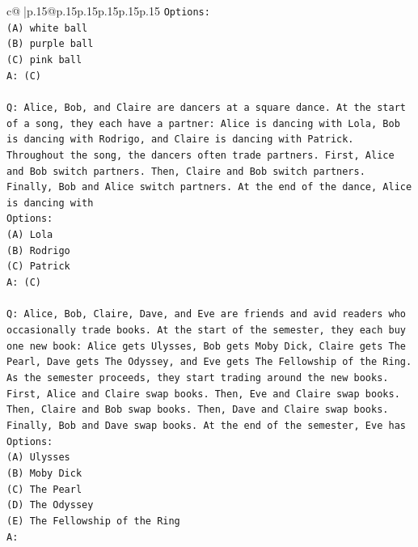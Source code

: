\documentclass{article}
\begin{document}
{\begin{supertabular}{c@{$\;$}|p{.15\linewidth}@{}p{.15\linewidth}p{.15\linewidth}p{.15\linewidth}p{.15\linewidth}p{.15\linewidth}}
{{{\texttt{Options:} \\
\texttt{(A) white ball} \\
\texttt{(B) purple ball} \\
\texttt{(C) pink ball} \\
\texttt{A: (C)} \\
\\ 
\texttt{Q: Alice, Bob, and Claire are dancers at a square dance. At the start of a song, they each have a partner: Alice is dancing with Lola, Bob is dancing with Rodrigo, and Claire is dancing with Patrick.} \\
\texttt{Throughout the song, the dancers often trade partners. First, Alice and Bob switch partners. Then, Claire and Bob switch partners. Finally, Bob and Alice switch partners. At the end of the dance, Alice is dancing with} \\
\texttt{Options:} \\
\texttt{(A) Lola} \\
\texttt{(B) Rodrigo} \\
\texttt{(C) Patrick} \\
\texttt{A: (C)} \\
\\ 
\texttt{Q: Alice, Bob, Claire, Dave, and Eve are friends and avid readers who occasionally trade books. At the start of the semester, they each buy one new book: Alice gets Ulysses, Bob gets Moby Dick, Claire gets The Pearl, Dave gets The Odyssey, and Eve gets The Fellowship of the Ring.} \\
\texttt{As the semester proceeds, they start trading around the new books. First, Alice and Claire swap books. Then, Eve and Claire swap books. Then, Claire and Bob swap books. Then, Dave and Claire swap books. Finally, Bob and Dave swap books. At the end of the semester, Eve has} \\
\texttt{Options:} \\
\texttt{(A) Ulysses} \\
\texttt{(B) Moby Dick} \\
\texttt{(C) The Pearl} \\
\texttt{(D) The Odyssey} \\
\texttt{(E) The Fellowship of the Ring} \\
\texttt{A:} \\
            }
        }
    }
     \\ \\


\end{supertabular}}
\end{document}
